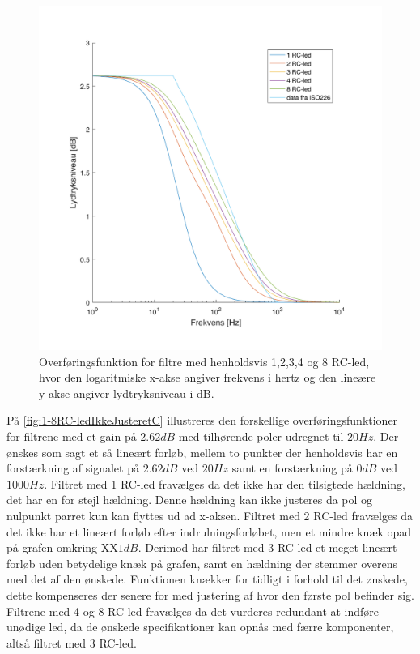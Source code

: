 %
\begin{figure}[H]
	\centering
	\includegraphics[resolution=300,width=\textwidth]{Figure/DesignAfFilter/1,2,3,4,8RC-ledGain2,62.pdf}
	\caption{Overføringsfunktion for filtre med henholdsvis 1,2,3,4 og 8 RC-led, hvor den logaritmiske x-akse angiver frekvens i hertz og den lineære y-akse angiver lydtryksniveau i dB.}
	\label{fig:1-8RC-ledIkkeJusteretC}
\end{figure}
\noindent
%
På \autoref{fig:1-8RC-ledIkkeJusteretC} illustreres den forskellige overføringsfunktioner for filtrene med et gain på $2.62 dB$ med tilhørende poler udregnet til $20 Hz$.
Der ønskes som sagt et så lineært forløb, mellem to punkter der henholdsvis har en forstærkning af signalet på $2.62 dB$ ved $20 Hz$ samt en forstærkning på $0 dB$ ved $1000 Hz$.
Filtret med 1 RC-led fravælges da det ikke har den tilsigtede hældning, det har en for stejl hældning.
Denne hældning kan ikke justeres da pol og nulpunkt parret kun kan flyttes ud ad x-aksen.
Filtret med 2 RC-led fravælges da det ikke har et lineært forløb efter indrulningsforløbet, men et mindre knæk opad på grafen omkring XX$1 dB$.
Derimod har filtret med 3 RC-led et meget lineært forløb uden betydelige knæk på grafen, samt en hældning der stemmer overens med det af den ønskede.
Funktionen knækker for tidligt i forhold til det ønskede, dette kompenseres der senere for med justering af hvor den første pol befinder sig.
Filtrene med 4 og 8 RC-led fravælges da det vurderes redundant at indføre unødige led, da de ønskede specifikationer kan opnås med færre komponenter, altså filtret med 3 RC-led.


